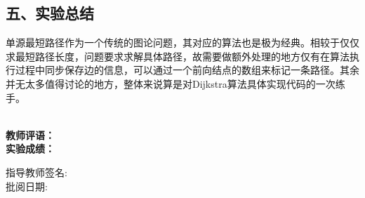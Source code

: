 \documentclass[UTF8, a4paper]{ctexart}
\begin{document}
\subsection*{五、实验总结}
单源最短路径作为一个传统的图论问题，其对应的算法也是极为经典。相较于仅仅求最短路径长度，问题要求求解具体路径，故需要做额外处理的地方仅有在算法执行过程中同步保存边的信息，可以通过一个前向结点的数组来标记一条路径。其余并无太多值得讨论的地方，整体来说算是对Dijkstra算法具体实现代码的一次练手。

~\\
\textbf{教师评语：}
~\\
\textbf{实验成绩：}

\begin{flushright}
\mbox{指导教师签名:\qquad\qquad} \\
\mbox{批阅日期:\qquad\qquad}
\end{flushright}
\end{document}

